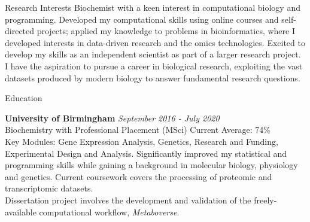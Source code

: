 \documentclass{resume}
\begin{document}
\begin{rSection}{Research Interests}
Biochemist with a keen interest in computational biology and programming. Developed my computational skills using online courses and self-directed projects; applied my knowledge to problems in bioinformatics, where I developed interests in data-driven research and the omics technologies. Excited to develop my skills as an independent scientist as part of a larger research project. I have the aspiration to pursue a career in biological research, exploiting the vast datasets produced by modern biology to answer fundamental research questions.
\end{rSection}
\begin{rSection}{Education}

{\bf University of Birmingham} \hfill {\em September 2016 - July 2020} 
\\ Biochemistry with Professional Placement (MSci) \hfill {Current Average: 74\%} \smallskip \\
Key Modules: Gene Expression Analysis, Genetics, Research and Funding, Experimental Design and Analysis. Significantly improved my statistical and programming skills while gaining a background in molecular biology, physiology and genetics. Current coursework covers the processing of proteomic and transcriptomic datasets. \smallskip \\ Dissertation project involves the development and validation of the freely-available computational workflow, \textit{Metaboverse}.  \\

\end{rSection}
\end{document}
